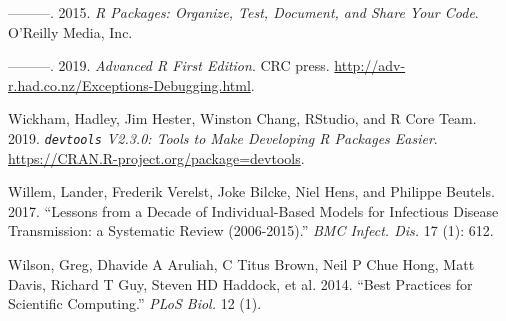 \documentclass[]{elsarticle} %
\begin{document}
\leavevmode\hypertarget{ref-wickham2015r}{}%
---------. 2015. \emph{R Packages: Organize, Test, Document, and Share Your Code}. O'Reilly Media, Inc.

\leavevmode\hypertarget{ref-wickham2019advanced}{}%
---------. 2019. \emph{Advanced R First Edition}. CRC press. \url{http://adv-r.had.co.nz/Exceptions-Debugging.html}.

\leavevmode\hypertarget{ref-devtools}{}%
Wickham, Hadley, Jim Hester, Winston Chang, RStudio, and R Core Team. 2019. \emph{\texttt{devtools} V2.3.0: Tools to Make Developing R Packages Easier}. \url{https://CRAN.R-project.org/package=devtools}.

\leavevmode\hypertarget{ref-willem2017lessons}{}%
Willem, Lander, Frederik Verelst, Joke Bilcke, Niel Hens, and Philippe Beutels. 2017. ``Lessons from a Decade of Individual-Based Models for Infectious Disease Transmission: a Systematic Review (2006-2015).'' \emph{BMC Infect. Dis.} 17 (1): 612.

\leavevmode\hypertarget{ref-wilson2014best}{}%
Wilson, Greg, Dhavide A Aruliah, C Titus Brown, Neil P Chue Hong, Matt Davis, Richard T Guy, Steven HD Haddock, et al. 2014. ``Best Practices for Scientific Computing.'' \emph{PLoS Biol.} 12 (1).
\end{document}
